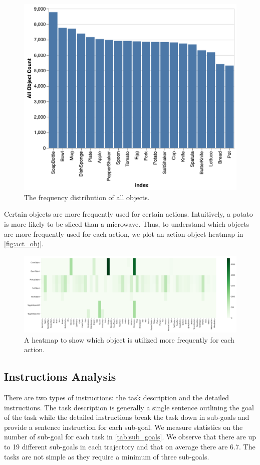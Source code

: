 \documentclass[11pt,a4paper]{article}
\begin{document}
\begin{figure}
    \centering
    \includegraphics[width=\linewidth]{Reports/1-Task-Definition-and-Data/all_obj.png}
    \caption{The frequency distribution of all objects.}
    \label{fig:all_obj}
\end{figure}

Certain objects are more frequently used for certain actions. Intuitively, a potato is more likely to be sliced than a microwave. Thus, to understand which objects are more frequently used for each action, we plot an action-object heatmap in \autoref{fig:act_obj}.

\begin{figure}
    \centering
    \includegraphics[width=\linewidth]{Reports/1-Task-Definition-and-Data/act_obj.png}
    \caption{A heatmap to show which object is utilized more frequently for each action.}
    \label{fig:act_obj}
\end{figure}

\subsection{Instructions Analysis}
There are two types of instructions: the task description and the detailed instructions. The task description is generally a single sentence outlining the goal of the task while the detailed instructions break the task down in sub-goals and provide a sentence instruction for each sub-goal. We measure statistics on the number of sub-goal for each task in \autoref{tab:sub_goals}. We observe that there are up to 19 different sub-goals in each trajectory and that on average there are 6.7. The tasks are not simple as they require a minimum of three sub-goals.
\end{document}
